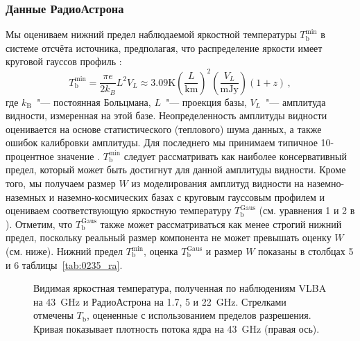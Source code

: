 \subsubsection{Данные РадиоАстрона}

Мы оцениваем нижний предел наблюдаемой яркостной температуры $T_\text{b}^\text{min}$ в системе
отсчёта источника, предполагая, что распределение яркости имеет круговой гауссов профиль
\cite{Lobanov_2015a}:
\begin{equation}
T_\mathrm{b}^\mathrm{min} = \frac{\pi e}{2k_B} L^2 V_L \approx 3.09 \mathrm{K}
\left(\frac{L}{\mathrm{km}}\right)^2\left(\frac{V_L}{\mathrm{mJy}}\right) (1+z)\,,
\end{equation}
где $k_\text{B}$~"--- постоянная Больцмана, $L$~"--- проекция базы, $V_L$~"--- амплитуда
видности, измеренная на этой базе. Неопределенность амплитуды видности оценивается на
основе статистического (теплового) шума данных, а также ошибок калибровки амплитуды. Для последнего
мы принимаем типичное 10-процентное значение \cite{Kovalev_2014_rus}. $T_\text{b}^\text{min}$
следует рассматривать как наиболее консервативный предел, который может быть достигнут для данной
амплитуды видности. Кроме того, мы получаем размер $W$ из моделирования амплитуд видности на
наземно-наземных и наземно-космических базах с круговым гауссовым профилем и оцениваем
соответствующую яркостную температуру $T_\text{b}^\text{Gaus}$ (см. уравнения 1 и 2 в
\cite{Lobanov_2015a}). Отметим, что $T_\text{b}^\text{Gaus}$ также может рассматриваться как менее
строгий нижний предел, поскольку реальный размер компонента не может превышать оценку $W$ (см.
ниже). Нижний предел $T_\text{b}^\text{min}$, оценка $T_\text{b}^\text{Gaus}$ и размер $W$ показаны
в столбцах 5 и 6 таблицы~\ref{tab:0235_ra}.

\begin{figure}[tbh]
\caption{Видимая яркостная температура, полученная по наблюдениям VLBA на \SI{43}{\GHz} и
РадиоАстрона на 1.7, 5 и \SI{22}{\GHz}. Стрелками отмечены $T_\text{b}$, оцененные с
использованием пределов разрешения. Кривая показывает плотность потока ядра на \SI{43}{\GHz}
(правая ось).}
\label{fig:0235_Tb_core_flux}
\end{figure}

